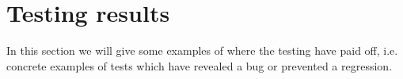 \section{Testing results}
In this section we will give some examples of where the testing have paid off, 
i.e. concrete examples of tests which have revealed a bug or prevented a regression.

